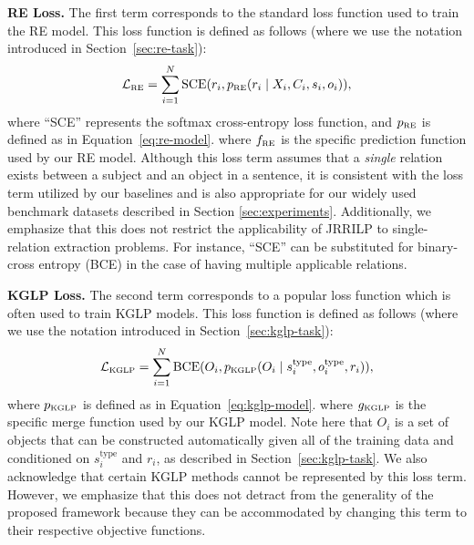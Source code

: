 \textbf{RE Loss.}
The first term corresponds to the standard loss function used to train the RE model.
This loss function is defined as follows (where we use the notation introduced in Section~\ref{sec:re-task}):
\begin{equation}
    \mathcal{L}_{\textrm{\tiny RE}} = \sum_{i=1}^N \textrm{SCE}(r_i, p_{\textrm{\tiny RE}}(r_i \mid X_i, C_i, s_i, o_i)),
\end{equation}
where ``SCE'' represents the softmax cross-entropy loss function, and $p_{\textrm{\tiny RE}}$ is defined as in Equation~\ref{eq:re-model}.
where $f_{\textrm{\tiny RE}}$ is the specific prediction function used by our RE model.
Although this loss term assumes that a {\em single} relation exists between a subject and an object in a sentence, it is consistent with the loss term utilized by our baselines and is also appropriate for our widely used benchmark datasets described in Section \ref{sec:experiments}.
Additionally, we emphasize that this does not restrict the applicability of JRRILP to single-relation extraction problems.
For instance, ``SCE'' can be substituted for binary-cross entropy (BCE) in the case of having multiple applicable relations.

\textbf{KGLP Loss.}
The second term corresponds to a popular loss function which is often used to train KGLP models.
This loss function is defined as follows (where we use the notation introduced in Section~\ref{sec:kglp-task}):
\begin{equation}
    \mathcal{L}_{\textrm{\tiny KGLP}} = \sum_{i=1}^N \textrm{BCE}(O_i, p_{\textrm{\tiny KGLP}}(O_i \mid s^{\textrm{type}}_i, o^{\textrm{type}}_i, r_i)),
\end{equation}
where 
$p_{\textrm{\tiny KGLP}}$ is defined as in Equation~\ref{eq:kglp-model}.
where $g_{\textrm{\tiny KGLP}}$ is the specific merge function used by our KGLP model.
Note here that $O_i$ is a set of objects that can be constructed automatically given all of the training data and conditioned on $s^{\textrm{type}}_i$ and $r_i$, as described in Section~\ref{sec:kglp-task}.
We also acknowledge that certain KGLP methods \citep{bordes2013translating, yang2015embedding, transr_ctranr, transd, trouillon2016complex} cannot be represented by this loss term.
However, we emphasize that this does not detract from the generality of the proposed framework because they can be accommodated by changing this term to their respective objective functions.

